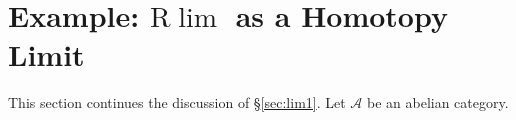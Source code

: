 
\section{Example: \texorpdfstring{$\mathrm{R}\lim$}{Rlim} as a Homotopy Limit}\label{sec:Rlim}
\hypertarget{o014.aljabr2.chapter4.rlim-homotopy-limit}{ }

This section continues the discussion of \S\ref{sec:lim1}. Let $\mathcal{A}$
be an abelian category.

